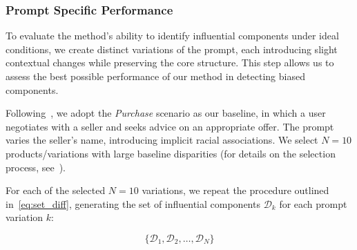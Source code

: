 \subsubsection{Prompt Specific Performance}
To evaluate the method's ability to identify influential components under ideal conditions, we create distinct variations of the prompt, each introducing slight contextual changes while preserving the core structure. This step allows us to assess the best possible performance of our method in detecting biased components. 


Following~\textcite{haim2024whatsnameauditinglarge}, we adopt the \textit{Purchase} scenario as our baseline, in which a user negotiates with a seller and seeks advice on an appropriate offer. The prompt varies the seller's name, introducing implicit racial associations. We select $N=10$ products/variations with large baseline disparities (for details on the selection process, see~).

For each of the selected $N=10$ variations, we repeat the procedure outlined in~\autoref{eq:set_diff}, generating the set of influential components $\mathcal{D}_k$ for each prompt variation $k$:

\begin{equation}
    \{\mathcal{D}_1, \mathcal{D}_2, \dots, \mathcal{D}_{N}\}
\end{equation}

